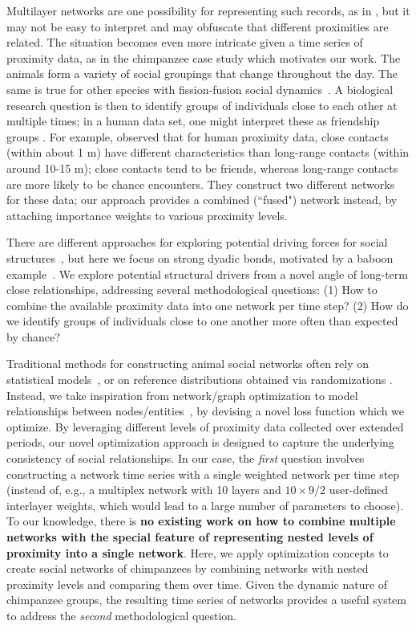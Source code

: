 \documentclass{article}
\theoremstyle{plain}
\theoremstyle{definition}
\theoremstyle{remark}
\begin{document}
Multilayer networks are one possibility for representing such records, as in  \citet{kivela2014multilayer}, but it may not be easy to interpret and may obfuscate that different proximities are related.
The situation becomes even more intricate given a time series of proximity data, as in the chimpanzee case study which motivates our work. The animals form a variety of social groupings that change throughout the day. The same is true for other species with fission-fusion social dynamics~\cite{silk2014importance, ramos2018quantifying}. A biological research question is then to identify groups of individuals close to each other at multiple times; in a human data set, one might interpret these as friendship groups \cite{sekara2014strength}. For example, \citet{stopczynski2018physical} observed that for human proximity data, close contacts (within about 1 m) have different characteristics than long-range contacts (within around 10-15 m); close contacts tend to be friends, whereas long-range contacts are more likely to be chance encounters. They construct two different networks for these data; our approach provides a combined (``fused") network instead, by attaching importance weights to various proximity levels.


There are different approaches for exploring potential driving forces for social structures~\cite{roehner2007driving}, but here we focus on strong dyadic bonds, motivated by a baboon example~\cite{lerch2021better}. We explore potential structural drivers from a novel angle of long-term close relationships, addressing several methodological questions: (1) How to combine the available proximity data into one network per time step? 
(2) How do we identify groups of individuals close to one another more often than expected by chance?


Traditional methods for constructing animal social networks often rely on statistical models~\cite{farine2015constructing,brask2024introduction}, or on reference distributions obtained via randomizations \cite{hobson2021guide}. Instead, we take inspiration from network/graph optimization to model relationships between nodes/entities~\cite{Zhou, he2024robust}, by devising a novel loss function which we optimize. By leveraging different levels of proximity data collected over extended periods, our novel optimization approach is designed to capture the underlying consistency of social relationships. In our case, the \emph{first} question involves constructing a network time series with a single weighted network per time step (instead of, e.g., a multiplex network with 10 layers and $10\times 9/2$ user-defined interlayer weights, which would lead to a large number of parameters to choose). To our knowledge, there is \textbf{no existing work on how to combine multiple networks with the special feature of representing nested levels of proximity into a single network}. Here, we apply optimization concepts to create social networks of chimpanzees by combining networks with nested proximity levels and comparing them over time. Given the dynamic nature of chimpanzee groups, the resulting time series of networks provides a useful system to address the \emph{second} methodological question. 
\end{document}
